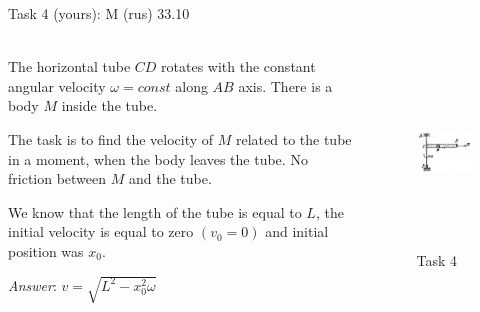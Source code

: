 \documentclass[aspectratio=169]{beamer}
\newcommand{\fbckg}[1]{\usebackgroundtemplate{\texttt{[image: \#1]}}}%
\begin{document}
\begin{frame}[t]{Task 4 (yours): M (rus) 33.10}
    \framesubtitle{}
    \vspace*{-0.6cm}
    \begin{columns}[T,onlytextwidth]
        \begin{column}{0.49\textwidth}
            The horizontal tube $CD$ rotates with the constant angular velocity $\omega=const$ along $AB$ axis. There is a body $M$ inside the tube.

            The task is to find the velocity of $M$ related to the tube in a moment, when the body leaves the tube. No friction between $M$ and the tube.

            We know that the length of the tube is equal to $L$, the initial velocity is equal to zero $(v_0 = 0)$ and initial position was $x_0$.
            \bigskip

            \textit{Answer}: $v=\sqrt{L^2 - x_0 ^2 \omega}$
        \end{column}
        \begin{column}{0.49\textwidth}
            \begin{figure}[H]
                \centering\includegraphics[height=5cm,width=1\textwidth,keepaspectratio]{image25.png}
                \caption*{Task 4}
                \label{fig:image25.png}
            \end{figure}
        \end{column}
    \end{columns}
\end{frame}

\fbckg{fibeamer/figs/last_page.png}
\frame[plain]{}
\end{document}
